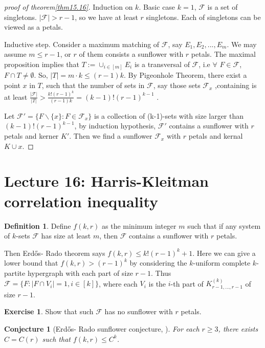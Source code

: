 \documentclass{article}
\newtheorem{conjecture}[theorem]{Conjecture}
\theoremstyle{definition}
\newtheorem{definition}[theorem]{Definition}
\newtheorem{exercise}[theorem]{Exercise}
\def\Erdos{Erd\H{o}s}
\begin{document}
\begin{proof}[proof of theorem\ref{thm15.16}]
    Induction on $k$. Basic case $k=1$, $\mathcal{F}$ is a set of singletons.
    $|\mathcal{F}|>r-1$, so we have at least $r$ singletons. Each of singletons can be viewed as a petals. 

    Inductive step. Consider a maximum matching of $\mathcal{F}$, say $E_1,E_2,...,E_m$. We may assume $m\leq r-1$, or $r$ of them consists a sunflower with $r$ petals. The maximal proposition implies that $T:=\cup_{i\in [m]} E_i$ is a transversal of $\mathcal{F}$, i.e $\forall$ $F\in \mathcal{F}$, $F\cap T\neq \emptyset$. So, $|T|=m\cdot k\leq (r-1)k$. By Pigeonhole Theorem, there exist a point $x$ in $T$, such that the number of sets in $\mathcal{F}$, say those sets $\mathcal{F}_x$ ,containing is at least $\frac{|\mathcal{F}|}{|T|}> \frac{k!(r-1)^k}{(r-1)k}=(k-1)!(r-1)^{k-1}$ .

    Let $\mathcal{F}'=\{F\backslash \{x\}: F\in\mathcal{F}_x \}$ is a collection of (k-1)-sets with size larger than $(k-1)!(r-1)^{k-1}$, by induction hypothesis,  $\mathcal{F}'$ contains a sunflower with $r$ petals and kerner $K'$. Then we find a sunflower $\mathcal{F}_x$ with $r$ petals and kernal $K\cup {x}$. 

    
\end{proof}



\newpage
\section{Lecture 16: Harris-Kleitman correlation inequality}
\begin{definition}
    Define $f(k,r)$ as the minimum integer $m$ such that if any system of $k$-sets $\mathcal{F}$ has size at least $m$, then $\mathcal{F}$ contains a sunflower with $r$ petals.
\end{definition}
Then \Erdos{}- Rado theorem says $f(k,r) \leq k!(r-1)^k+1$. Here we can give a lower bound that $f(k,r) > (r-1)^k$ by considering the $k$-uniform complete $k$-partite hypergraph with each part of size $r-1$. Thus $\mathcal{F} = \{F: |F\cap V_i| =1, i\in [k]\}$, where each $V_i$ is the $i$-th part of $K_{r-1, \dots, r-1}^{(k)}$ of size $r-1$.

\begin{exercise}
    Show that such $\mathcal{F}$ has no sunflower with $r$ petals.
\end{exercise}

\begin{conjecture}[\Erdos{}- Rado sunflower conjecture, \cite{Erds1960IntersectionTF}]
    For each $r \geq 3$, there exists $C = C(r)$ such that $f(k,r) \leq C^k$.
\end{conjecture}
\end{document}
